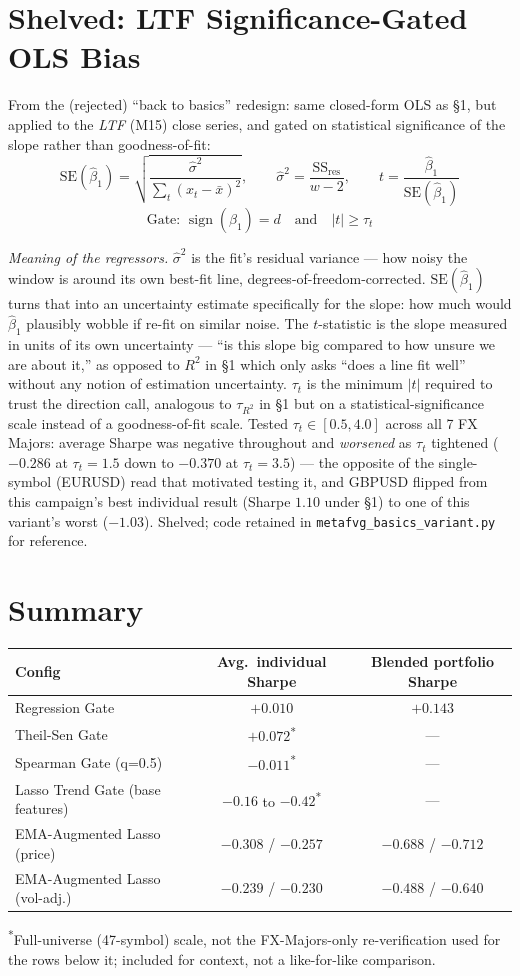 \documentclass[11pt]{article}
\newcommand{\meaningpar}[1]{\par\noindent\textit{Meaning of the regressors.} #1}
\begin{document}
\section{Shelved: LTF Significance-Gated OLS Bias}
From the (rejected) ``back to basics'' redesign: same closed-form OLS as \S1, but applied to the
\emph{LTF} (M15) close series, and gated on statistical significance of the slope rather than
goodness-of-fit:
\[
\mathrm{SE}(\hat\beta_1) = \sqrt{\frac{\hat\sigma^2}{\sum_t(x_t-\bar x)^2}}, \qquad
\hat\sigma^2 = \frac{\mathrm{SS}_{\mathrm{res}}}{w-2}, \qquad
t = \frac{\hat\beta_1}{\mathrm{SE}(\hat\beta_1)}
\]
\[
\text{Gate: } \operatorname{sign}(\hat\beta_1) = d \quad \text{and} \quad |t| \ge \tau_t
\]
\meaningpar{$\hat\sigma^2$ is the fit's residual variance --- how noisy the window is around its
own best-fit line, degrees-of-freedom-corrected. $\mathrm{SE}(\hat\beta_1)$ turns that into an
uncertainty estimate specifically for the slope: how much would $\hat\beta_1$ plausibly wobble if
re-fit on similar noise. The $t$-statistic is the slope measured in units of its own uncertainty
--- ``is this slope big compared to how unsure we are about it,'' as opposed to $R^2$ in \S1 which
only asks ``does a line fit well'' without any notion of estimation uncertainty. $\tau_t$ is the
minimum $|t|$ required to trust the direction call, analogous to $\tau_{R^2}$ in \S1 but on a
statistical-significance scale instead of a goodness-of-fit scale. Tested $\tau_t \in [0.5, 4.0]$
across all 7 FX Majors: average Sharpe was negative throughout and \emph{worsened} as $\tau_t$
tightened ($-0.286$ at $\tau_t{=}1.5$ down to $-0.370$ at $\tau_t{=}3.5$) --- the opposite of the
single-symbol (EURUSD) read that motivated testing it, and GBPUSD flipped from this campaign's
best individual result (Sharpe $1.10$ under \S1) to one of this variant's worst ($-1.03$). Shelved;
code retained in \texttt{metafvg\_basics\_variant.py} for reference.}

\section*{Summary}
\begin{center}
\begin{tabular}{lcc}
\toprule
Config & Avg.\ individual Sharpe & Blended portfolio Sharpe \\
\midrule
Regression Gate & $+0.010$ & $+0.143$ \\
Theil-Sen Gate & $+0.072$\textsuperscript{*} & --- \\
Spearman Gate (q=0.5) & $-0.011$\textsuperscript{*} & --- \\
Lasso Trend Gate (base features) & $-0.16$ to $-0.42$\textsuperscript{*} & --- \\
EMA-Augmented Lasso (price) & $-0.308$ / $-0.257$ & $-0.688$ / $-0.712$ \\
EMA-Augmented Lasso (vol-adj.) & $-0.239$ / $-0.230$ & $-0.488$ / $-0.640$ \\
\bottomrule
\end{tabular}
\end{center}
{\small\textsuperscript{*}Full-universe (47-symbol) scale, not the FX-Majors-only re-verification
used for the rows below it; included for context, not a like-for-like comparison.}
\end{document}
